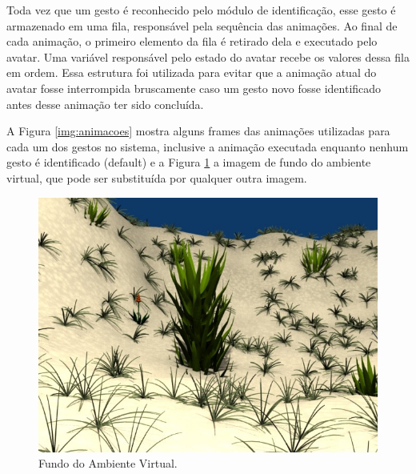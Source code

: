 Toda vez que um gesto é reconhecido pelo módulo de identificação, esse gesto é armazenado em uma fila, responsável pela sequência das animações. Ao final de cada animação, o primeiro elemento da fila é retirado dela e executado pelo avatar. Uma variável responsável pelo estado do avatar recebe os valores dessa fila em ordem. Essa estrutura foi utilizada para evitar que a animação atual do avatar fosse interrompida bruscamente caso um gesto novo fosse identificado antes desse animação ter sido concluída.

A Figura \ref{img:animacoes} mostra alguns frames das animações utilizadas para cada um dos gestos no sistema, inclusive a animação executada enquanto nenhum gesto é identificado (default) e a Figura \ref{img:fundo_ambiente_virtual} a imagem de fundo do ambiente virtual, que pode ser substituída por qualquer outra imagem.

\begin{figure}[!htbp]
  \center
  \includegraphics[scale=0.25]{imagens/fundo_ambiente_virtual.jpg}
  \caption{Fundo do Ambiente Virtual.}
  \label{img:fundo_ambiente_virtual}
\end{figure}


